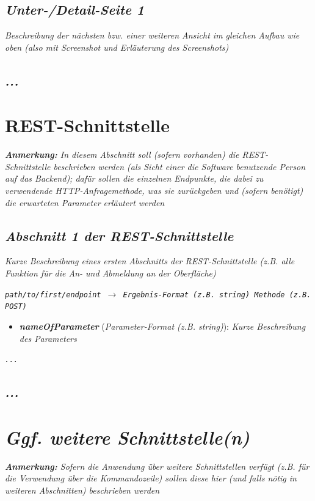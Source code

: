 \documentclass[a4paper,10pt]{scrartcl}
\begin{document}
\subsection{\textit{Unter-/Detail-Seite 1}}

\textit{Beschreibung der nächsten bzw. einer weiteren Ansicht im gleichen Aufbau wie oben (also mit Screenshot und Erläuterung des Screenshots)}

\subsection{\textit{...}}

\newpage

\section{REST-Schnittstelle}

\textit{\textbf{Anmerkung:} In diesem Abschnitt soll (sofern vorhanden) die REST-Schnittstelle beschrieben werden (als Sicht einer die Software benutzende Person auf das Backend); dafür sollen die einzelnen Endpunkte, die dabei zu verwendende HTTP-Anfragemethode, was sie zurückgeben und (sofern benötigt) die erwarteten Parameter erläutert werden}

\subsection{\textit{Abschnitt 1 der REST-Schnittstelle}}

\textit{Kurze Beschreibung eines ersten Abschnitts der REST-Schnittstelle (z.B. alle Funktion für die An- und Abmeldung an der Oberfläche)\\}

\texttt{\textit{path/to/first/endpoint} $\rightarrow$ \textit{Ergebnis-Format (z.B. \glqq string\grqq)} \dotfill \textit{Methode (z.B. POST)}}
\begin{itemize}[label={}]
    \item \textbf{\textit{nameOfParameter}} (\textit{Parameter-Format (z.B. \glqq string\grqq)}): \textit{Kurze Beschreibung des Parameters}
\end{itemize}

\texttt{\textit{...}}

\subsection{\textit{...}}

\newpage

\section{\textit{Ggf. weitere Schnittstelle(n)}}

\textit{\textbf{Anmerkung:} Sofern die Anwendung über weitere Schnittstellen verfügt (z.B. für die Verwendung über die Kommandozeile) sollen diese hier (und falls nötig in weiteren Abschnitten) beschrieben werden}
\end{document}
